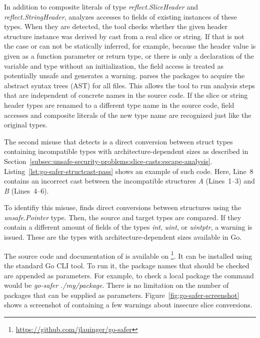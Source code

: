 

In addition to composite literals of type \textit{reflect.SliceHeader} and \textit{reflect.StringHeader}, \toolSafer{}
analyzes accesses to fields of existing instances of these types.
When they are detected, the tool checks whether the given header structure instance was derived by cast from a real
slice or string.
If that is not the case or can not be statically inferred, for example, because the header value is given as a function
parameter or return type, or there is only a declaration of the variable and type without an initialization, the
field access is treated as potentially unsafe and \toolSafer{} generates a warning.
\toolSafer{} parses the packages to acquire the abstract syntax trees (\acrshort{AST}) for all files.
This allows the tool to run analysis steps that are independent of concrete names in the source code.
If the slice or string header types are renamed to a different type name in the source code, field accesses and
composite literals of the new type name are recognized just like the original types.

The second misuse that \toolSafer{} detects is a direct conversion between struct types containing incompatible types
with architecture-dependent sizes as described in
Section~\ref{subsec:unsafe-security-problems:slice-casts:escape-analysis}.
Listing~\ref{lst:go-safer-structcast-pass} shows an example of such code.
Here, Line~8 contains an incorrect cast between the incompatible structures \textit{A} (Lines~1--3) and \textit{B}
(Lines~4--6).



To identifiy this misuse, \toolSafer{} finds direct conversions between structures using the \textit{unsafe.Pointer}
type.
Then, the source and target types are compared.
If they contain a different amount of fields of the types \textit{int}, \textit{uint}, or \textit{uintptr}, a warning
is issued.
These are the types with architecture-dependent sizes available in Go.

The source code and documentation of \toolSafer{} is available on
\github{}\footnote{\url{https://github.com/jlauinger/go-safer}}.
It can be installed using the standard Go \acrshort{CLI} tool.
To run it, the package names that should be checked are appended as parameters.
For example, to check a local package the command would be \textit{go-safer ./my/package}.
There is no limitation on the number of packages that can be supplied as parameters.
Figure~\ref{fig:go-safer-screenshot} shows a screenshot of \toolSafer{} containing a few warnings about insecure slice
conversions.

